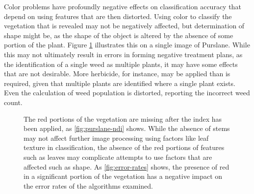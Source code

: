 \documentclass[letterpaper]{report}
\begin{document}
{Color problems have profoundly negative effects on classification accuracy that depend on using features that are then distorted. Using color to classify the vegetation that is revealed may not be negatively affected, but determination of shape might be, as the shape of the object is altered by the absence of some portion of the plant. Figure \ref{fig:segmentation-color-problem} illustrates this on a single image of Purslane. While this may not ultimately result in errors in forming negative treatment plans, as the identification of a single weed as multiple plants, it may have some effects that are not desirable. More herbicide, for instance, may be applied than is required, given that multiple plants are identified where a single plant exists. Even the calculation of weed population is distorted, reporting the incorrect weed count.


\begin{figure}[H]
	\centering
	\hfill
	\hfill
	\caption[Missing red portions of vegetation]{The red portions of the vegetation are missing after the index has been applied, as \ref{fig:purslane-ndi} shows. While the absence of stems may not affect further image processing using factors like leaf texture in classification, the absence of the red portions of features such as leaves may complicate attempts to use factors that are affected such as shape. As \ref{fig:error-rates} shows, the presence of red in a significant portion of the vegetation has a negative impact on the error rates of the algorithms examined.}
	\label{fig:segmentation-color-problem}
\end{figure}

}
\end{document}
